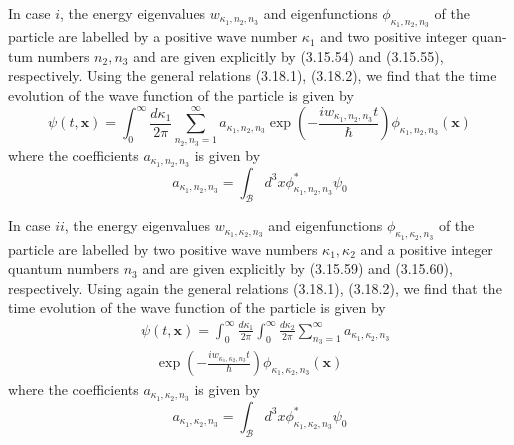 \documentclass{article}
\begin{document}
In case $i$, the energy eigenvalues $w_{\kappa_{1}, n_{2}, n_{3}}$ and eigenfunctions $\phi_{\kappa_{1}, n_{2}, n_{3}}$ of the particle are labelled by a positive wave number $\kappa_{1}$ and two positive integer quan-
tum numbers $n_{2}, n_{3}$ and are given explicitly by (3.15.54) and (3.15.55), respectively. Using the general relations (3.18.1), (3.18.2), we find that the time evolution of the wave function of the particle is given by
$$
\begin{equation*}
\psi(t, \boldsymbol{x})=\int_{0}^{\infty} \frac{d \kappa_{1}}{2 \pi} \sum_{n_{2}, n_{3}=1}^{\infty} a_{\kappa_{1}, n_{2}, n_{3}} \exp \left(-\frac{i w_{\kappa_{1}, n_{2}, n_{3}} t}{\hbar}\right) \phi_{\kappa_{1}, n_{2}, n_{3}}(\boldsymbol{x}) \tag{3.19.4}
\end{equation*}
$$
where the coefficients $a_{\kappa_{1}, n_{2}, n_{3}}$ is given by
$$
\begin{equation*}
a_{\kappa_{1}, n_{2}, n_{3}}=\int_{\mathcal{B}} d^{3} x \phi_{\kappa_{1}, n_{2}, n_{3}}^{*} \psi_{0} \tag{3.19.5}
\end{equation*}
$$

In case $i i$, the energy eigenvalues $w_{\kappa_{1}, \kappa_{2}, n_{3}}$ and eigenfunctions $\phi_{\kappa_{1}, \kappa_{2}, n_{3}}$ of the particle are labelled by two positive wave numbers $\kappa_{1}, \kappa_{2}$ and a positive integer quantum numbers $n_{3}$ and are given explicitly by (3.15.59) and (3.15.60), respectively. Using again the general relations (3.18.1), (3.18.2), we find that the time evolution of the wave function of the particle is given by
$$
\begin{align*}
& \psi(t, \boldsymbol{x})=\int_{0}^{\infty} \frac{d \kappa_{1}}{2 \pi} \int_{0}^{\infty} \frac{d \kappa_{2}}{2 \pi} \sum_{n_{3}=1}^{\infty} a_{\kappa_{1}, \kappa_{2}, n_{3}}  \tag{3.19.6}\\
& \quad \exp \left(-\frac{i w_{\kappa_{1}, \kappa_{2}, n_{3}} t}{\hbar}\right) \phi_{\kappa_{1}, \kappa_{2}, n_{3}}(\boldsymbol{x})
\end{align*}
$$
where the coefficients $a_{\kappa_{1}, \kappa_{2}, n_{3}}$ is given by
$$
\begin{equation*}
a_{\kappa_{1}, \kappa_{2}, n_{3}}=\int_{\mathcal{B}} d^{3} x \phi_{\kappa_{1}, \kappa_{2}, n_{3}}^{*} \psi_{0} \tag{3.19.7}
\end{equation*}
$$
\end{document}
